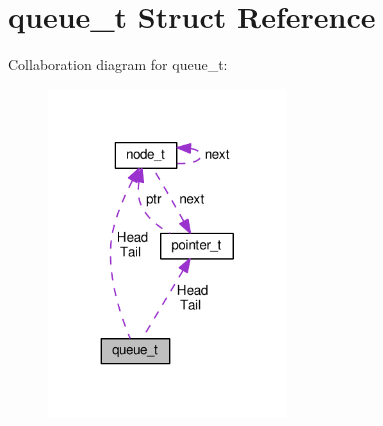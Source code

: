 \hypertarget{structqueue__t}{}\section{queue\+\_\+t Struct Reference}
\label{structqueue__t}


Collaboration diagram for queue\+\_\+t\+:
\nopagebreak
\begin{figure}[H]
\begin{center}
\leavevmode
\includegraphics[width=179pt]{structqueue__t__coll__graph}
\end{center}
\end{figure}
